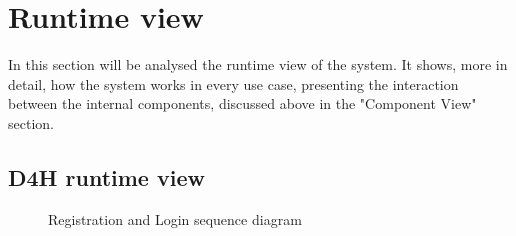 \section{Runtime view}
\label{RuntimeView}
    
In this section will be analysed the runtime view of the system. It shows, more in detail, how the system works in every use case, presenting the interaction between the internal components, discussed above in the "Component View" section.

\subsection{D4H runtime view}


    
\begin{figure}[H]
    \centering
    \caption{Registration and Login sequence diagram}
    \label{fig:log&regDiagram}
\end{figure}

